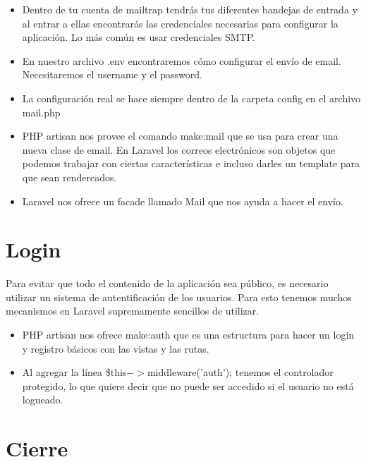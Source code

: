 \documentclass{article}
\begin{document}
\begin{itemize}
  \item Dentro de tu cuenta de mailtrap tendrás tus diferentes bandejas de
    entrada y al entrar a ellas encontrarás las credenciales necesarias para
    configurar la aplicación. Lo más común es usar credenciales SMTP.
  \item En nuestro archivo .env encontraremos cómo configurar el envío de
    email. Necesitaremos el username y el password.
  \item La configuración real se hace siempre dentro de la carpeta config en el
    archivo mail.php
  \item PHP artisan nos provee el comando make:mail que se usa para crear una
    nueva clase de email. En Laravel los correos electrónicos son objetos que
    podemos trabajar con ciertas características e incluso darles un template
    para que sean rendereados.
  \item Laravel nos ofrece un facade llamado Mail que nos ayuda a hacer el
    envío.
\end{itemize}

\section{Login}%
Para evitar que todo el contenido de la aplicación sea público, es necesario
utilizar un sistema de autentificación de los usuarios. Para esto tenemos
muchos mecanismos en Laravel supremamente sencillos de utilizar.\\

\begin{itemize}
  \item PHP artisan nos ofrece make:auth que es una estructura para hacer un
    login y registro básicos con las vistas y las rutas.
  \item Al agregar la línea \$this$->$middleware('auth'); tenemos el controlador
    protegido, lo que quiere decir que no puede ser accedido si el usuario no
    está logueado.
\end{itemize}

\section{Cierre}%
\end{document}
